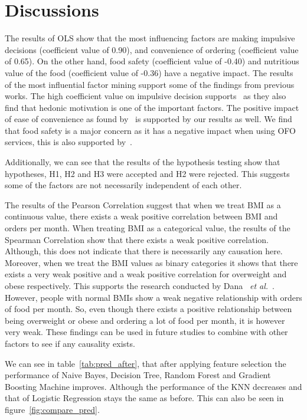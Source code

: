 \documentclass[a4paper,fleqn]{cas-sc}
\newcommand{\etal}{\textit{et al.}}
\begin{document}
\section{Discussions}

The results of OLS show that the most influencing factors are making impulsive decisions (coefficient value of 0.90), and convenience of ordering (coefficient value of 0.65). On the other hand, food safety (coefficient value of -0.40) and nutritious value of the food (coefficient value of -0.36) have a negative impact. The results of the most influential factor mining support some of the findings from previous works. The high coefficient value on impulsive decision supports~\cite{alagoz_2012} as they also find that hedonic motivation is one of the important factors. The positive impact of ease of convenience as found by~\cite{kale_customer_perception_2020, alagoz_2012, vinish2021} is supported by our results as well. We find that food safety is a major concern as it has a negative impact when using OFO services, this is also supported by~\cite{hong_2021}.

Additionally, we can see that the results of the hypothesis testing show that hypotheses, H1, H2 and H3 were accepted and H2 were rejected. This suggests some of the factors are not necessarily independent of each other.

The results of the Pearson Correlation suggest that when we treat BMI as a continuous value, there exists a weak positive correlation between BMI and orders per month. When treating BMI as a categorical value, the results of the Spearman Correlation show that there exists a weak positive correlation. Although, this does not indicate that there is necessarily any causation here. Moreover, when we treat the BMI values as binary categories it shows that there exists a very weak positive and a weak positive correlation for overweight and obese respectively. This supports the research conducted by Dana ~\etal~\cite{dana2021}. However, people with normal BMIs show a weak negative relationship with orders of food per month. So, even though there exists a positive relationship between being overweight or obese and ordering a lot of food per month, it is however very weak. These findings can be used in future studies to combine with other factors to see if any causality exists.

We can see in table~\ref{tab:pred_after}, that after applying feature selection the performance of Naive Bayes, Decision Tree, Random Forest and Gradient Boosting Machine improves. Although the performance of the KNN decreases and that of Logistic Regression stays the same as before. This can also be seen in figure~\ref{fig:compare_pred}.
\end{document}
